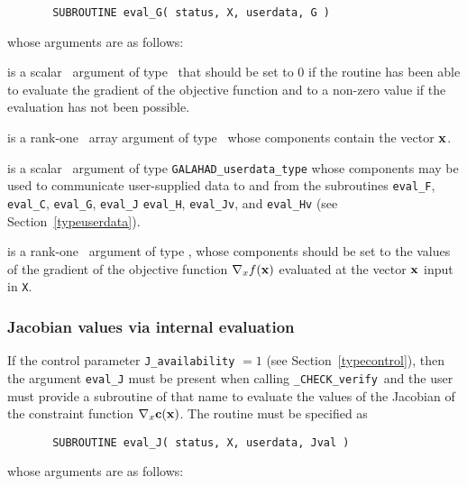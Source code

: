\documentclass{galahad}
\newcommand{\packagename}{CHECK}
\newcommand{\fullpackagename}{\libraryname\_\packagename}
\newcommand{\solver}{{\tt \fullpackagename\_verify}}
\begin{document}
\def\baselinestretch{0.8}
{\tt \begin{verbatim}
       SUBROUTINE eval_G( status, X, userdata, G ) \end{verbatim} }
\def\baselinestretch{1.0}
\noindent whose arguments are as follows:

\begin{description}
 is a scalar \intentout\ argument of type \integer\
that should be set to 0 if the routine has been able to evaluate
the gradient of the objective function
and to a non-zero value if the evaluation has not been possible.

 is a rank-one \intentin\ array argument of type \realdp\
whose components contain the vector ${\mathbf{x}}$.

 is a scalar \intentinout\ argument of type 
{\tt GALAHAD\_userdata\_type} whose components may be used
to communicate user-supplied data to and from the
subroutines {\tt eval\_F}, {\tt eval\_C}, {\tt eval\_G}, {\tt eval\_J}
{\tt eval\_H}, {\tt eval\_Jv}, and {\tt eval\_Hv} 
(see Section~\ref{typeuserdata}).

 is a rank-one \intentout\ argument of type \realdp,
whose components should be set to the values of the gradient 
of the objective function $\nabla_x f({\mathbf{x}})$
evaluated at the vector ${\mathbf{x}}$ input in {\tt X}.

\end{description}


\subsubsection{Jacobian values via internal evaluation\label{jfv}}

If the control parameter {\tt J\_availability} $=1$ (see
Section~\ref{typecontrol}), then the argument {\tt eval\_J} must be
present when calling \solver\ and the
user must provide a subroutine of that name to evaluate the
values of the Jacobian of the constraint function $\nabla_x {\mathbf{c}}({\mathbf{x}})$.
The routine must be specified as

\def\baselinestretch{0.8}
{\tt \begin{verbatim}
       SUBROUTINE eval_J( status, X, userdata, Jval ) \end{verbatim} }
\def\baselinestretch{1.0}
\noindent whose arguments are as follows:
\end{document}
